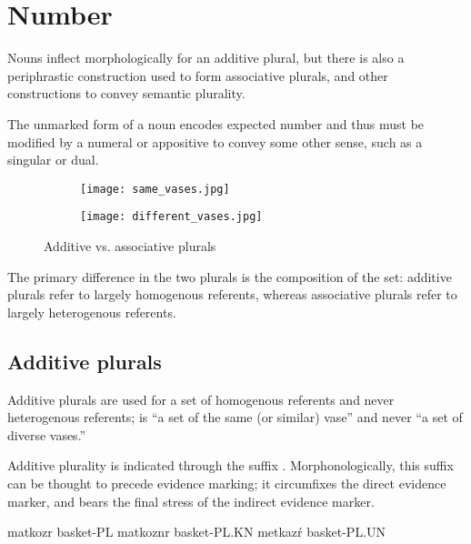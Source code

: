 \section{Number}
Nouns inflect morphologically for an additive plural, but there is also a periphrastic construction used to form associative plurals, and other constructions to convey semantic plurality.

The unmarked form of a noun encodes expected number  and thus must be modified by a numeral or appositive to convey some other sense, such as a singular or dual. 

\begin{figure}[h]
    \centering
    \begin{subfigure}{0.4\textwidth}
        \centering
        \texttt{[image: same\_vases.jpg]}
        \caption{}
    \end{subfigure}
    \begin{subfigure}{0.4\textwidth}
        \centering
        \texttt{[image: different\_vases.jpg]}
        \caption{}
    \end{subfigure}
    \caption{Additive vs. associative plurals}
\end{figure}

The primary difference in the two plurals is the composition of the set: additive plurals refer to largely homogenous referents, whereas associative plurals refer to largely heterogenous referents.

\subsection{Additive plurals} \label{subsec:additive_plural}
Additive plurals are used for a set of homogenous referents and never heterogenous referents; \eg {} is “a set of the same (or similar) vase” and never “a set of diverse vases.”

Additive plurality is indicated through the suffix . Morphonologically, this suffix can be thought to precede evidence marking; it circumfixes the direct evidence marker, and bears the final stress of the indirect evidence marker.

\begin{subexamples}
    \ex
        \script matkozr
        \gloss basket-PL
    \ex 
        \script matkoznr
        \gloss basket-PL.KN
    \ex
        \script metkazŕ
        \gloss basket-PL.UN
\end{subexamples}

